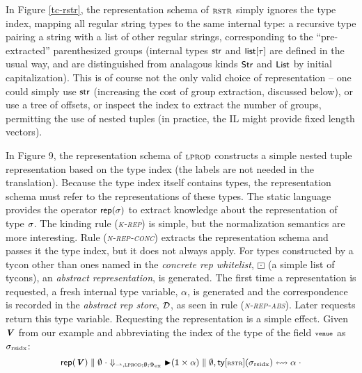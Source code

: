 \documentclass[9pt,preprint]{sigplanconf}
\newcommand{\rulename}[1]{({\textsc{\textsl{#1}}})}
\begin{document}
In Figure \ref{tc-rstr}, the representation schema of $\tcvar{rstr}$ simply ignores the type index, mapping all regular string types to the same internal type: a recursive type pairing a string  with a list of other regular strings, corresponding to the ``pre-extracted'' parenthesized groups (internal types $\keyw{str}$ and $\keyw{list}[\tau]$ are defined in the usual way, and are distinguished from analagous kinds $\keyw{Str}$ and $\keyw{List}$ by initial capitalization). This is of course not the only valid choice of representation -- one could simply use $\keyw{str}$ (increasing the cost of group extraction, discussed below), or use a tree of offsets, or inspect the index to extract the number of groups, permitting the use of nested tuples (in practice, the IL might provide fixed length vectors). %

In Figure 9, the representation schema of $\tcvar{lprod}$ constructs a simple nested tuple representation based on the type index (the labels are not needed in the translation). Because the type index itself contains types, the representation schema must refer to the representations of these types. The static language provides the operator $\srep{\st}$ to extract knowledge about the representation of type $\st$. The kinding rule \rulename{k-rep} is simple, but the normalization semantics are more interesting. Rule \rulename{n-rep-conc}  extracts the representation schema and  passes it the type index, but it does not always apply. For types constructed by a tycon other than ones named in the \emph{concrete rep whitelist}, $\boxdot$ (a simple list of tycons), an \emph{abstract representation}, is generated. The first time a representation is requested, a fresh internal type variable, $\alpha$, is generated and the correspondence is recorded in the \emph{abstract rep store}, $\memD$, as seen in rule \rulename{n-rep-abs}. Later requests return this type variable. Requesting the representation is a simple effect. Given $\svar{V}$ from our example and abbreviating the index of the type of the field $\conclbl{venue}$ as $\stx{rsidx}$: \[\scriptsize\snorm{\srep{\normalsize\svar{V}\scriptsize}}{\emptyset}{\cdot}{{\rightharpoonup},\tcvar{lprod}; \emptyset; \Phi_\text{ex}}{\sqity{\iunit\times\alpha}}{\emptyset, \sty{\tcvar{rstr}}{\stx{rsidx}} \leftrightsquigarrow \alpha}{\cdot}\]
\end{document}
